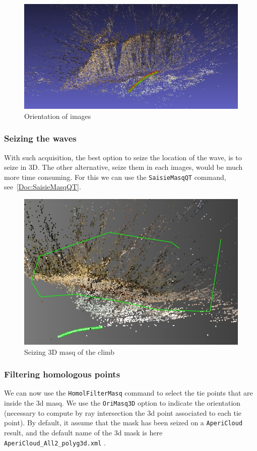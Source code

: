\begin{figure}
\centering
\includegraphics[width=0.80\linewidth]{FIGS/GoProVideo/Aperi000.jpg}
\caption{Orientation of images}
\label{fig:GoProOri0}
\end{figure}


\subsubsection{Seizing the waves}

With such acquisition, the best option to seize the location of the wave, is to seize in 3D. The other alternative, 
seize them in each images, would be much more time consuming. For this we can use the {\tt SaisieMasqQT} command,
see~\ref{Doc:SaisieMasqQT}.


\begin{figure}
\centering
\includegraphics[width=0.80\linewidth]{FIGS/GoProVideo/Masq3D.jpg}
\caption{Seizing 3D masq  of the climb}
\label{fig:GoProOri0}
\end{figure}

\subsubsection{Filtering homologous points}

We can now use the  {\tt HomolFilterMasq} command to select the tie points that are inside the $3$d masq.
We use the {\tt OriMasq3D} option to indicate the orientation (necessary to compute by ray intersection the $3$d point
associated to each tie point). By default, it assume that the mask has been seized on a {\tt AperiCloud} result, and
the default name of the $3$d mask is  here {\tt AperiCloud\_All2\_polyg3d.xml} .


